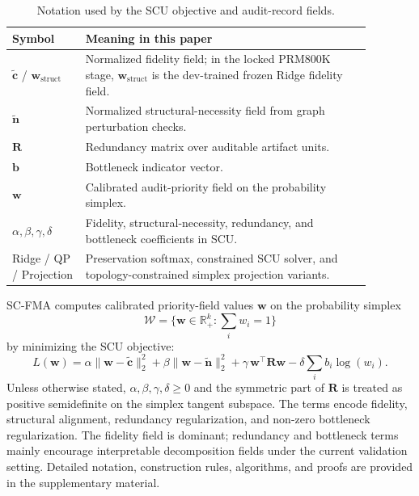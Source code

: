 \documentclass[pdflatex,sn-mathphys-num,iicol]{sn-jnl}
\newcommand{\wstruct}{\ensuremath{\mathbf{w}_{\mathrm{struct}}}}
\begin{document}
\begin{table}[ht]
\caption{Notation used by the SCU objective and audit-record fields.}
\label{tab:notation}
\centering
\small
\renewcommand{\arraystretch}{1.08}
\begin{tabular}{Z{0.18\linewidth}Z{0.70\linewidth}}
\toprule
\textbf{Symbol} & \textbf{Meaning in this paper} \\
\midrule
$\tilde{\mathbf{c}}$ / \wstruct{} & Normalized fidelity field; in the locked PRM800K stage, \wstruct{} is the dev-trained frozen Ridge fidelity field. \\
$\tilde{\mathbf{n}}$ & Normalized structural-necessity field from graph perturbation checks. \\
$\mathbf{R}$ & Redundancy matrix over auditable artifact units. \\
$\mathbf{b}$ & Bottleneck indicator vector. \\
$\mathbf{w}$ & Calibrated audit-priority field on the probability simplex. \\
$\alpha,\beta,\gamma,\delta$ & Fidelity, structural-necessity, redundancy, and bottleneck coefficients in SCU. \\
Ridge / QP / Projection & Preservation softmax, constrained SCU solver, and topology-constrained simplex projection variants. \\
\bottomrule
\end{tabular}
\end{table}

SC-FMA computes calibrated priority-field values $\mathbf{w}$ on the probability simplex
\begin{equation}
\mathcal{W}=\{\mathbf{w}\in\mathbb{R}_{+}^{k}: \sum_i w_i = 1\}
\label{eq:scu-feasible-set}
\end{equation}
by minimizing the SCU objective:
\begin{equation}
L(\mathbf{w}) =
\alpha\|\mathbf{w} - \tilde{\mathbf{c}}\|_2^2
+ \beta\|\mathbf{w} - \tilde{\mathbf{n}}\|_2^2
+ \gamma\,\mathbf{w}^{\top}\mathbf{R}\mathbf{w}
- \delta\sum_i b_i \log(w_i).
\label{eq:scu}
\end{equation}
Unless otherwise stated, $\alpha,\beta,\gamma,\delta \ge 0$ and the symmetric part of $\mathbf{R}$ is treated as positive semidefinite on the simplex tangent subspace. The terms encode fidelity, structural alignment, redundancy regularization, and non-zero bottleneck regularization. The fidelity field is dominant; redundancy and bottleneck terms mainly encourage interpretable decomposition fields under the current validation setting. Detailed notation, construction rules, algorithms, and proofs are provided in the supplementary material.
\end{document}
